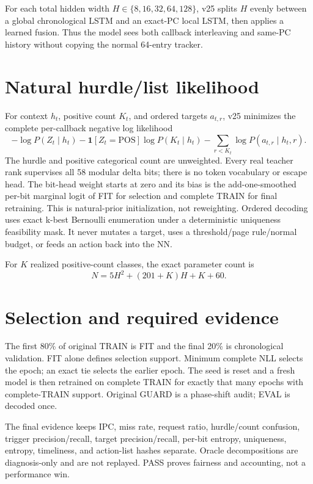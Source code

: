 \documentclass[10pt]{article}
\begin{document}
For each total hidden width $H\in\{8,16,32,64,128\}$, v25 splits $H$ evenly
between a global chronological LSTM and an exact-PC local LSTM, then applies a
learned fusion.  Thus the model sees both callback interleaving and same-PC
history without copying the normal 64-entry tracker.

\section*{Natural hurdle/list likelihood}
For context $h_t$, positive count $K_t$, and ordered targets $a_{t,r}$, v25
minimizes the complete per-callback negative log likelihood
\[
-\log P(Z_t\mid h_t)
-\mathbf{1}[Z_t=\mathrm{POS}]\log P(K_t\mid h_t)
-\sum_{r<K_t}\log P(a_{t,r}\mid h_t,r).
\]
The hurdle and positive categorical count are unweighted.  Every real teacher
rank supervises all 58 modular delta bits; there is no token vocabulary or
escape head.  The bit-head weight starts at zero and its bias is the
add-one-smoothed per-bit marginal logit of FIT for selection and complete TRAIN
for final retraining.  This is natural-prior initialization, not reweighting.
Ordered decoding uses exact k-best Bernoulli enumeration under a deterministic
uniqueness feasibility mask.  It never mutates a target, uses a threshold/page
rule/normal budget, or feeds an action back into the NN.

For $K$ realized positive-count classes, the exact
parameter count is
\[
N=5H^2+(201+K)H+K+60.
\]

\section*{Selection and required evidence}
The first 80\% of original TRAIN is FIT and the final 20\% is chronological
validation.  FIT alone defines selection support.  Minimum complete NLL
selects the epoch; an exact tie selects the earlier epoch.  The seed is reset
and a fresh model is then retrained on complete TRAIN for exactly that many
epochs with complete-TRAIN support.  Original GUARD is a phase-shift audit;
EVAL is decoded once.

The final evidence keeps IPC, miss rate, request ratio, hurdle/count confusion,
trigger precision/recall, target precision/recall, per-bit entropy,
uniqueness, entropy, timeliness, and action-list hashes separate.  Oracle
decompositions are diagnosis-only and are not replayed.  PASS proves fairness
and accounting, not a performance win.
\end{document}
